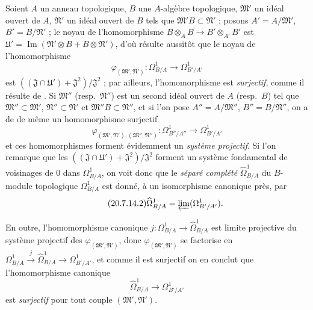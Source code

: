 \begin{env}[20.7.14]
\label{0.20.7.14-fr}
Soient $A$ un anneau topologique, $B$ une $A$-algèbre topologique,
$\mathfrak{M}'$ un idéal ouvert de $A$, $\mathfrak{N}'$ un idéal ouvert de
$B$ tels que $\mathfrak{M}'B\subset\mathfrak{N}'$ ; posons
$A'=A/\mathfrak{M}'$,
$B'=B/\mathfrak{N}'$ ; le noyau de l'homomorphisme
$B\otimes_A B\to B'\otimes_{A'}B'$ est
$\mathfrak{U}'=\operatorname{Im}(\mathfrak{N}'\otimes B+B\otimes\mathfrak{N}')$,
d'où résulte aussitôt que le noyau de l'homomorphisme
\begin{equation}
\tag{20.7.14.1}
\label{0.20.7.14.1-fr}
  \varphi_{(\mathfrak{M}',\mathfrak{N}')}:
  \Omega^1_{B/A}\to\Omega^1_{B'/A'}
\end{equation}
est $((\mathfrak{J}\cap\mathfrak{U}')+\mathfrak{J}^2)/\mathfrak{J}^2$ ; par
ailleurs, l'homomorphisme  est \emph{surjectif}, comme il
résulte de . Si $\mathfrak{M}''$ (resp.\
$\mathfrak{N}''$) est un second idéal ouvert de $A$ (resp.\ $B$) tel que
$\mathfrak{M}''\subset\mathfrak{M}'$, $\mathfrak{N}''\subset\mathfrak{N}'$
et $\mathfrak{M}''B\subset\mathfrak{N}''$, et si l'on pose
$A''=A/\mathfrak{M}''$, $B''=B/\mathfrak{N}''$, on a de de même un
homomorphisme surjectif
\[
  \varphi_{(\mathfrak{M}',\mathfrak{N}'),(\mathfrak{M}'',\mathfrak{N}'')}:
  \Omega^1_{B''/A''}\to\Omega^1_{B'/A'}
\]
et ces homomorphismes forment évidemment un \emph{système projectif}. Si
l'on remarque que les
$((\mathfrak{J}\cap\mathfrak{U}')+\mathfrak{J}^2)/\mathfrak{J}^2$ forment
un système fondamental de voisinages de $0$ dans $\Omega^1_{B/A}$, on voit
donc que le \emph{séparé complété} $\widehat{\Omega}^1_{B/A}$ du $B$-module
topologique $\Omega^1_{B/A}$ est donné, à un isomorphisme canonique près, par
\begin{equation}
\tag{20.7.14.2}
\label{0.20.7.14.2-fr}
  \widehat{\Omega}^1_{B/A}=\varprojlim(\Omega^1_{B'/A'}).
\end{equation}

En outre, l'homomorphisme canonique
$j:\Omega^1_{B/A}\to\widehat{\Omega}^1_{B/A}$ est limite projective du
système projectif des $\varphi_{(\mathfrak{M}',\mathfrak{N}')}$, donc
$\varphi_{(\mathfrak{M}',\mathfrak{N}')}$ se factorise en
$\Omega^1_{B/A}\xrightarrow{j}\widehat{\Omega}^1_{B/A}\to
\Omega^1_{B'/A'}$, et comme il est surjectif on en conclut que
l'homomorphisme canonique
\begin{equation}
\tag{20.7.14.3}
\label{0.20.7.14.3-fr}
  \widehat{\Omega}^1_{B/A}\to\Omega^1_{B'/A'}
\end{equation}
est \emph{surjectif} pour tout couple $(\mathfrak{M}',\mathfrak{N}')$.


\end{env}
